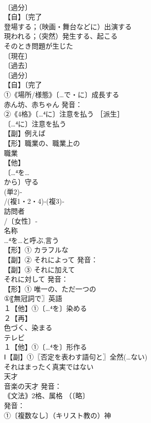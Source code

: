 \documentclass[8pt]{extreport}
\begin{document}
\begin{CJK}{UTF8}{min}
\\	〔過分〕
\\	【自】〔完了
\\	登場する；（映画・舞台などに）出演する 
\\	現われる；（突然）発生する、起こる　
\\	そのとき問題が生じた
\\	〔現在〕
\\	〔過去〕
\\	〔過分〕
\\	【自】〔完了
\\	①《場所/様態》〔…で・に〕成長する 
\\	赤ん坊、赤ちゃん 発音：
\\	②《4格》〔…⁴に〕注意を払う ［派生］ 
\\	〔…⁴に〕注意を払う
\\	【副】例えば 
\\	【形】職業の、職業上の 
\\	職業
\\	【他】
\\	〔…⁴を…
\\	から〕守る 
\\	(単2)‐
\\	/(複1・2・4)‐(複3)‐
\\	訪問者 
\\	/〔女性〕‐
\\	名称 
\\	…⁴を…と呼ぶ,言う
\\	【形】① カラフルな 
\\	【副】② それによって 発音：
\\	【副】③ それに加えて　
\\	それに対して 発音：
\\	【形】① 唯一の、ただ一つの 
\\	①〖無冠詞で〗英語 
\\	１【他】①〔…⁴を〕染める 
\\	２【再】
\\	色づく、染まる
\\	テレビ 
\\	１【他】①〔…⁴を〕形作る 
\\	Ⅰ【副】①〖否定を表わす語句と〗全然(…ない) 
\\	それはまったく真実ではない
\\	天才 
\\	音楽の天才 発音：
\\	｟文法｠2格、属格 （〔略〕
\\	発音：
\\	①〔複数なし〕（キリスト教の）神 

\end{CJK}
\end{document}
